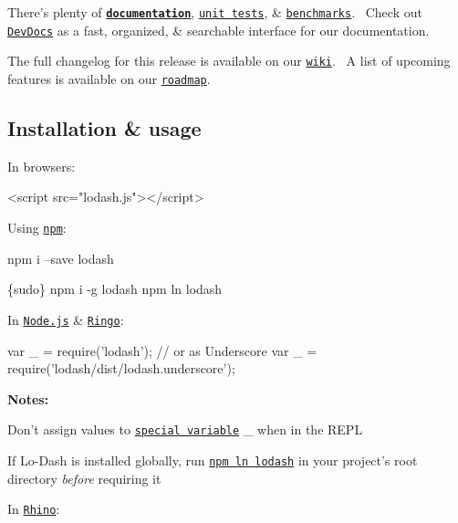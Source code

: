 There’s plenty of {\bfseries \href{https://lodash.com/docs}{\tt documentation}}, \href{https://lodash.com/tests}{\tt unit tests}, \& \href{https://lodash.com/benchmarks}{\tt benchmarks}.~\newline
 Check out \href{http://devdocs.io/lodash/}{\tt Dev\+Docs} as a fast, organized, \& searchable interface for our documentation.

The full changelog for this release is available on our \href{https://github.com/lodash/lodash/wiki/Changelog}{\tt wiki}.~\newline
 A list of upcoming features is available on our \href{https://github.com/lodash/lodash/wiki/Roadmap}{\tt roadmap}.

\subsection*{Installation \& usage}

In browsers\+:


\begin{DoxyCode}
<script src="lodash.js"></script>
\end{DoxyCode}


Using \href{http://npmjs.org/}{\tt {\ttfamily npm}}\+:


\begin{DoxyCode}
npm i --save lodash

\{sudo\} npm i -g lodash
npm ln lodash
\end{DoxyCode}


In \href{http://nodejs.org/}{\tt Node.\+js} \& \href{http://ringojs.org/}{\tt Ringo}\+:


\begin{DoxyCode}
var \_ = require('lodash');
// or as Underscore
var \_ = require('lodash/dist/lodash.underscore');
\end{DoxyCode}


{\bfseries Notes\+:}
\begin{DoxyItemize}
\item Don’t assign values to \href{http://nodejs.org/api/repl.html#repl_repl_features}{\tt special variable} {\ttfamily \+\_\+} when in the R\+E\+PL
\item If Lo-\/\+Dash is installed globally, run \href{http://blog.nodejs.org/2011/03/23/npm-1-0-global-vs-local-installation/}{\tt {\ttfamily npm ln lodash}} in your project’s root directory {\itshape before} requiring it
\end{DoxyItemize}

In \href{http://www.mozilla.org/rhino/}{\tt Rhino}\+:


